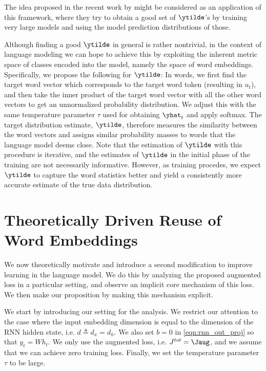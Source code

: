 The idea proposed in the recent work by \citet{hinton2015distilling} might be considered as an application of this framework, where they try to obtain a good set of $\ytilde$'s by training very large models and using the model prediction distributions of those.

Although finding a good $\ytilde$  in general is rather nontrivial, in the context of language modeling we can hope to achieve this by exploiting the inherent metric space of classes encoded into the model, namely the space of word embeddings.
Specifically, we propose the following for $\ytilde$:
In words, we first find the target word vector which corresponds to the target word token (resulting in $u_t$), and then take the inner product of the target word vector with all the other word vectors to get an unnormalized probability distribution.
We adjust this with the same temperature parameter $\tau$ used for obtaining $\yhat_t$ and apply softmax.
The target distribution estimate, $\ytilde$, therefore measures the similarity between the word vectors and assigns similar probability masses to words that the language model deems close.
Note that the estimation of $\ytilde$ with this procedure is iterative, and the estimates of $\ytilde$ in the initial phase of the training are not necessarily informative.
However, as training procedes, we expect $\ytilde$ to capture the word statistics better and yield a consistently more accurate estimate of the true data distribution.

\section{Theoretically Driven Reuse of Word Embeddings}
\label{section:RE}
We now theoretically motivate and introduce a second modification to improve learning in the language model.
We do this by analyzing the proposed augmented loss in a particular setting, and observe an implicit core mechanism of this loss.
We then make our proposition by making this mechanism explicit.

We start by introducing our setting for the analysis.
We restrict our attention to the case where the input embedding dimension is equal to the dimension of the RNN hidden state, i.e. $d\triangleq d_x=d_h$.
We also set $b=0$ in \eqref{eqn:rnn_out_proj} so that $y_t = Wh_t$. We only use the augmented loss, i.e. $J^{tot}=\Jaug$, and we assume that we can achieve zero training loss.
Finally, we set the temperature parameter $\tau$ to be large.
 
